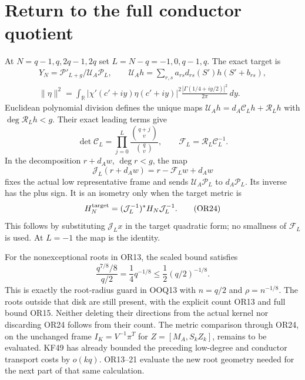 \documentclass[11pt]{article}
\newcommand{\Pp}{\mathcal P}
\newcommand{\UA}{\mathcal U_A}
\begin{document}
\section{Return to the full conductor quotient}
At $N=q-1,q,2q-1,2q$ set $L=N-q=-1,0,q-1,q$.
The exact target is
\[
\begin{gathered}
Y_N=\Pp'_{L+g}/\UA\Pp_L,\qquad
\UA h=\sum_{r,s}a_{rs}d_{rs}(S')h(S'+b_{rs}),\\
\|\eta\|^2=\int_\mathbb R|\chi'(c'+iy)\eta(c'+iy)|^2
 \frac{|\Gamma(1/4+iy/2)|^2}{2\pi}\,dy .
\end{gathered}
\tag{OR22}
\]
Euclidean polynomial division defines the unique maps
$\UA h=d_A\mathcal C_Lh+\mathcal R_Lh$ with
$\deg\mathcal R_Lh<g$. Their exact leading terms give
\[
\det\mathcal C_L=\prod_{j=0}^L
  \frac{\binom{q+j}{v}}{\binom qv},\qquad
\mathcal F_L=\mathcal R_L\mathcal C_L^{-1}.
\]
In the decomposition $r+d_Aw$, $\deg r<g$, the map
\[
\mathcal J_L(r+d_Aw)=r-\mathcal F_Lw+d_Aw
\tag{OR23}
\]
fixes the actual low representative frame and sends
$\UA\Pp_L$ to $d_A\Pp_L$. Its inverse has the plus sign.
It is an isometry only when the target metric is
\[
H_N^{\rm target}=(\mathcal J_L^{-1})^*H_N\mathcal J_L^{-1}.
\tag{OR24}
\]
This follows by substituting $\mathcal J_Lx$ in the target
quadratic form; no smallness of $\mathcal F_L$ is used.
At $L=-1$ the map is the identity.

For the nonexceptional roots in OR13, the scaled bound satisfies
\[
\frac{q^{7/8}/8}{q/2}=\frac14q^{-1/8}
\le \frac12(q/2)^{-1/8}.
\tag{OR25}
\]
This is exactly the root-radius guard in OOQ13 with $n=q/2$
and $\rho=n^{-1/8}$. The roots outside that disk are still
present, with the explicit count OR13 and full bound OR15.
Neither deleting their directions from the actual kernel nor
discarding OR24 follows from their count. The metric comparison
through OR24, on the unchanged frame
$I_K=V^{-1}\pi^T$ for $Z=[M_A,S_kZ_k]$, remains to be evaluated.
KF49 has already bounded the preceding low-degree and conductor
transport costs by $o(kq)$. OR13--21 evaluate the new root
geometry needed for the next part of that same calculation.
\end{document}
